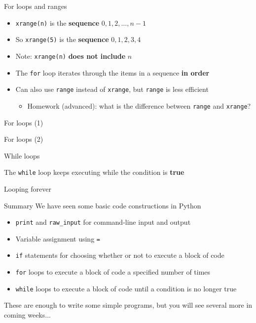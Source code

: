 \begin{frame}{For loops and ranges}

\begin{itemize}
\pause\item \lstinline{xrange(n)} is the \textbf{sequence}
$0, 1, 2, \dots, n-1$
\pause\item So \lstinline{xrange(5)} is the \textbf{sequence}
$0, 1, 2, 3, 4$
\pause\item Note: \lstinline{xrange(n)} \textbf{does not include} $n$
\pause\item The \lstinline{for} loop iterates through the items in a sequence \textbf{in order}
\pause\item Can also use \lstinline{range} instead of \lstinline{xrange},
but \lstinline{range} is less efficient
\begin{itemize}
\item Homework (advanced): what is the difference between \lstinline{range} and \lstinline{xrange}?
\end{itemize}
\end{itemize}
\end{frame}

\begin{frame}{For loops (1)}
\socrative
{}
\end{frame}

\begin{frame}{For loops (2)}
\socrative
{}
\end{frame}

\begin{frame}{While loops}
\socrative

The \lstinline{while} loop keeps executing while the condition is \textbf{true}

\end{frame}

\begin{frame}{Looping forever}

\end{frame}

\begin{frame}{Summary}
\pause We have seen some basic code constructions in Python
\begin{itemize}
\pause\item \lstinline{print} and \lstinline{raw_input} for command-line input and output
\pause\item Variable assignment using \lstinline{=}
\pause\item \lstinline{if} statements for choosing whether or not to execute a block of code
\pause\item \lstinline{for} loops to execute a block of code a specified number of times
\pause\item \lstinline{while} loops to execute a block of code until a condition is no longer true
\end{itemize}
\pause These are enough to write some simple programs, but you will see several more in coming weeks...
\end{frame}

